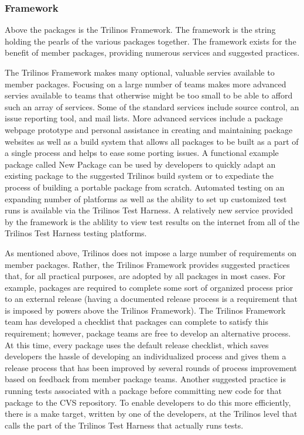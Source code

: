 \documentclass[12pt,relax]{article}
\begin{document}
  \subsubsection{Framework}
  
  Above the packages is the Trilinos Framework.  The framework is the string
  holding the pearls of the various packages together.  The framework exists
  for the benefit of member packages, providing numerous services and 
  suggested practices.

  The Trilinos Framework makes many optional, valuable servies available to
  member packages.  Focusing on a large number of teams
  makes more advanced servies available to teams that otherwise might be too
  small to be able to afford such an array of services.  Some of the standard
  services include source control, an issue reporting tool, and mail lists.
  More advanced services include a package webpage prototype and personal 
  assistance in creating and maintaining package websites as well as a build 
  system that allows all packages to be built as a part of a single process 
  and helps to ease some porting issues.  A functional example package called
  New Package can be used by developers to quickly adapt an existing package 
  to the suggested Trilinos build system or to expediate the process of 
  building a portable package from scratch.  Automated testing on an expanding 
  number of platforms as well as the ability to set up customized test runs is 
  available via the Trilinos Test Harness.  A relatively new service provided 
  by  the framework is the ablility to view test results on the internet from
  all of the Trilinos Test Harness testing platforms.
  
  As mentioned above, Trilinos does not impose a large number of requirements
  on member packages.  Rather, the Trilinos Framework provides suggested 
  practices that,
  for all practical purposes, are adopted by all packages in most cases.  For
  example, packages are required to complete some sort of organized process
  prior to an external release (having a documented release process is a 
  requirement that is imposed by powers above the Trilinos Framework).  The 
  Trilinos Framework team has developed a checklist that packages can complete
  to satisfy this requirement; however, package teams are free to develop an
  alternative process.  At this time, every package uses the default release
  checklist, which saves developers the hassle of developing an individualized
  process and gives them a release process that has
  been improved by several rounds of process improvement based on feedback from
  member package teams.  Another suggested practice is running tests
  associated with a package before committing new code for that package to the 
  CVS repository.  To enable developers to do this more efficiently, there is
  a make target, written by one of the developers, at the Trilinos level that
  calls the part of the Trilinos Test Harness that actually runs tests.
\end{document}

